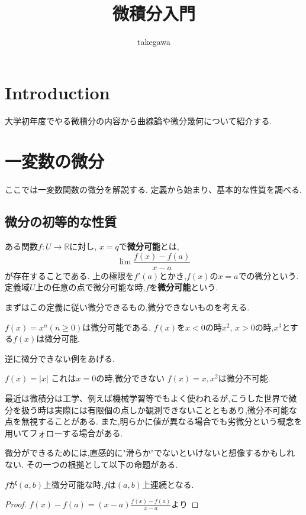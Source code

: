 \documentclass{ujarticle}
\title{微積分入門}
\author{takegawa}
\date{}
\begin{document}
\maketitle
\tableofcontents
\section{Introduction}
大学初年度でやる微積分の内容から曲線論や微分幾何について紹介する.

\section{一変数の微分}
ここでは一変数関数の微分を解説する.
定義から始まり、基本的な性質を調べる.
\subsection{微分の初等的な性質}
\begin{dfn}[微分]
ある関数$f:U \to \mathbb{R}$に対し,
$x=q$で\textbf{微分可能}とは,
\begin{equation*}
\lim \frac{f(x) - f(a)}{x-a}
\end{equation*}
が存在することである.
上の極限を$f'(a)$とかき,$f(x)$の$x=a$での微分という.
定義域$U$上の任意の点で微分可能な時,$f$を\textbf{微分可能}という.
\end{dfn}

まずはこの定義に従い微分できるもの,微分できないものを考える.
\begin{epl}
$f(x) = x^n(n \ge 0)$は微分可能である.
$f(x)$を$x < 0$の時$x^2$, $x> 0$の時,$x^3$とする$f(x)$は微分可能.
\end{epl}
逆に微分できない例をあげる.
\begin{epl}
$f(x) = |x|$
これは$x=0$の時,微分できない
$f(x) =  x, x^2$は微分不可能.
\end{epl}

\begin{rem}
最近は微積分は工学、例えば機械学習等でもよく使われるが,こうした世界で微分を扱う時は実際には有限個の点しか観測できないことともあり,微分不可能な点を無視することがある.
また,明らかに値が異なる場合でも劣微分という概念を用いてフォローする場合がある.
\end{rem}

微分ができるためには,直感的に"滑らか"でないといけないと想像するかもしれない.
その一つの根拠として以下の命題がある.

\begin{prop}
$f$が$(a,b)$上微分可能な時,$f$は$(a,b)$上連続となる.
\end{prop}
\begin{proof}
$f(x) - f(a) = (x-a) \frac{f(x) - f(a)}{x -a}$より
\end{proof}
\end{document}
